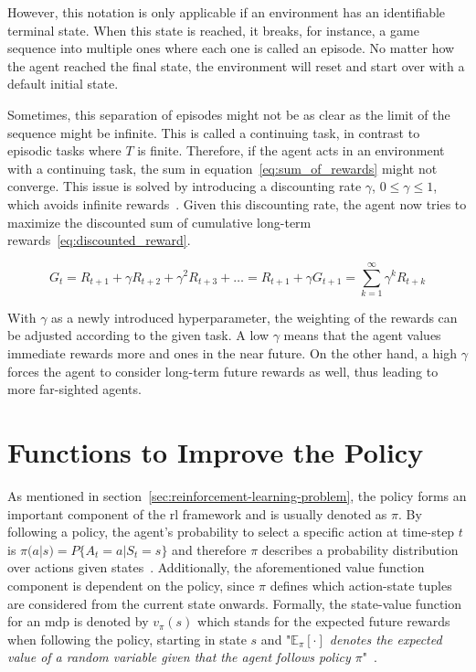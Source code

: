 \documentclass[draft,final]{vutinfth} %
\newcommand{\p}[1]{see p. #1}
\begin{document}
    However, this notation is only applicable if an environment has an identifiable terminal state.
    When this state is reached, it breaks, for instance, a game sequence into multiple ones where each one is called an episode.
    No matter how the agent reached the final state, the environment will reset and start over with a default initial state.

    Sometimes, this separation of episodes might not be as clear as the limit of the sequence might be infinite.
    This is called a continuing task, in contrast to episodic tasks where $T$ is finite.
    Therefore, if the agent acts in an environment with a continuing task, the sum in equation~\eqref{eq:sum_of_rewards} might not converge.
    This issue is solved by introducing a discounting rate $\gamma$, $0 \leq \gamma \leq 1$, which avoids infinite rewards~\citep[\p{54f}]{sutton_reinforcement_2018}.
    Given this discounting rate, the agent now tries to maximize the discounted sum of cumulative long-term rewards~\eqref{eq:discounted_reward}.

    \begin{equation}
        G_t = R_{t+1} + \gamma R_{t+2}+ \gamma^2 R_{t+3} + \ldots = R_{t+1} + \gamma G_{t+1} = \sum_{k=1}^{\infty} \gamma^k R_{t+k}\label{eq:discounted_reward}
    \end{equation}

    With $\gamma$ as a newly introduced hyperparameter, the weighting of the rewards can be adjusted according to the given task.
    A low $\gamma$ means that the agent values immediate rewards more and ones in the near future.
    On the other hand, a high $\gamma$ forces the agent to consider long-term future rewards as well, thus leading to more far-sighted agents.


    \section{Functions to Improve the Policy}\label{sec:functions-to-improve-the-policy}
    As mentioned in section~\ref{sec:reinforcement-learning-problem}, the policy forms an important component of the \gls{rl} framework and is usually denoted as $\pi$.
    By following a policy, the agent's probability to select a specific action at time-step $t$ is $\pi(a|s) = P\{A_t=a|S_t=s\}$ and therefore $\pi$ describes a probability distribution over actions given states~.
    Additionally, the aforementioned value function component is dependent on the policy, since $\pi$ defines which action-state tuples are considered from the current state onwards.
    Formally, the state-value function for an \gls{mdp} is denoted by $v_\pi(s)$ which stands for the expected future rewards when following the policy, starting in state $s$ and "\textit{$\mathbb{E}_\pi[\cdot]$ denotes the expected value of a random variable given that the agent follows policy $\pi$}"~\citep[\p{58}]{sutton_reinforcement_2018}.
\end{document}
